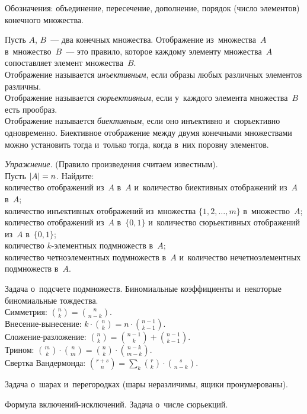 \begin{exercises}

\item
Обозначения: объединение, пересечение, дополнение, порядок (число элементов)
конечного множества.

\item
Пусть $A$, $B$~--- два конечных множества.
Отображение из~множества~$A$ в~множество~$B$~--- это правило, которое каждому
элементу множества~$A$ сопоставляет элемент множества~$B$.
\\
Отображение называется \textit{инъективным}, если образы любых различных
элементов различны.
\\
Отображение называется \textit{сюрьективным}, если у~каждого элемента
множества~$B$ есть прообраз.
\\
Отображение называется \textit{биективным}, если оно инъективно и~сюрьективно
одновременно.
Биективное отображение между двумя конечными множествами можно установить тогда
и~только тогда, когда в~них поровну элементов.

\item\emph{Упражнение.}
(Правило произведения считаем известным).
\\
Пусть $\lvert A \rvert = n$.
Найдите:
\\
\subproblem
количество отображений из~$A$ в~$A$ и~количество биективных отображений
из~$A$ в~$A$;
\\
\subproblem
количество инъективных отображений из~множества $\{1, 2, \ldots, m\}$
в~множество~$A$;
\\
\subproblem
количество отображений из~$A$ в~$\{0, 1\}$ и~количество сюрьективных
отображений из~$A$ в~$\{0, 1\}$;
\\
\subproblem
количество $k$-элементных подмножеств в~$A$;
\\
\subproblem
количество четноэлементных подмножеств в~$A$ и~количество нечетноэлементных
подмножеств в~$A$.

\item
Задача о~подсчете подмножеств.
Биномиальные коэффициенты и~некоторые биномиальные тождества.
\\
Симметрия: $\binom{n}{k} = \binom{n}{n-k}$.
\\
Внесение-вынесение: $k \cdot \binom{n}{k} = n \cdot \binom{n-1}{k-1}$.
\\
Сложение-разложение: $\binom{n}{k} = \binom{n-1}{k} + \binom{n-1}{k-1}$.
\\
Трином:
$\binom{m}{k} \cdot \binom{n}{m} = \binom{n}{k} \cdot \binom{n-k}{m-k}$.
\\
Свертка Вандермонда:
$\binom{r+s}{n} = \sum_{k} \binom{r}{k} \cdot \binom{s}{n-k}$.

\item
Задача о~шарах и~перегородках (шары неразличимы, ящики пронумерованы).

\item
Формула включений-исключений.
Задача о~числе сюрьекций.

\end{exercises}


